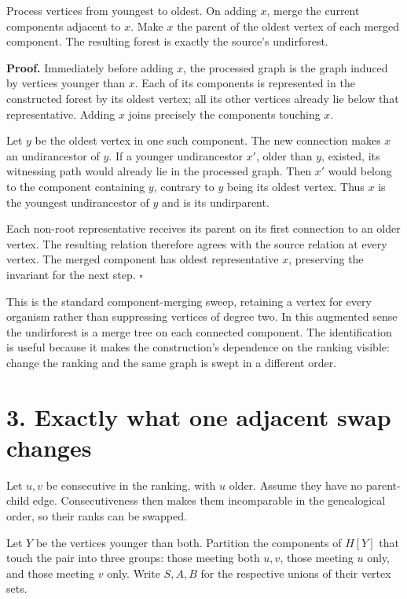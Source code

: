 \documentclass[
  11pt,
  letterpaper,
]{article}
\begin{document}
Process vertices from youngest to oldest. On adding \(x\), merge the
current components adjacent to \(x\). Make \(x\) the parent of the
oldest vertex of each merged component. The resulting forest is exactly
the source's undirforest.

\textbf{Proof.} Immediately before adding \(x\), the processed graph is
the graph induced by vertices younger than \(x\). Each of its components
is represented in the constructed forest by its oldest vertex; all its
other vertices already lie below that representative. Adding \(x\) joins
precisely the components touching \(x\).

Let \(y\) be the oldest vertex in one such component. The new connection
makes \(x\) an undirancestor of \(y\). If a younger undirancestor
\(x'\), older than \(y\), existed, its witnessing path would already lie
in the processed graph. Then \(x'\) would belong to the component
containing \(y\), contrary to \(y\) being its oldest vertex. Thus \(x\)
is the youngest undirancestor of \(y\) and is its undirparent.

Each non-root representative receives its parent on its first connection
to an older vertex. The resulting relation therefore agrees with the
source relation at every vertex. The merged component has oldest
representative \(x\), preserving the invariant for the next step.
\hfill\(\square\)

This is the standard component-merging sweep, retaining a vertex for
every organism rather than suppressing vertices of degree two. In this
augmented sense the undirforest is a merge tree on each connected
component. The identification is useful because it makes the
construction's dependence on the ranking visible: change the ranking and
the same graph is swept in a different order.

\section{3. Exactly what one adjacent swap
changes}\label{exactly-what-one-adjacent-swap-changes}

Let \(u,v\) be consecutive in the ranking, with \(u\) older. Assume they
have no parent-child edge. Consecutiveness then makes them incomparable
in the genealogical order, so their ranks can be swapped.

Let \(Y\) be the vertices younger than both. Partition the components of
\(H[Y]\) that touch the pair into three groups: those meeting both
\(u,v\), those meeting \(u\) only, and those meeting \(v\) only. Write
\(S,A,B\) for the respective unions of their vertex sets.
\end{document}
